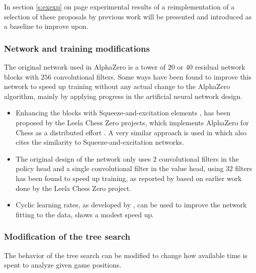 \documentclass[12pt,onecolumn,oneside,titlepage]{article}
\begin{document}
In section \ref{s:exexp} on page \pageref{s:exexp} experimental results of a reimplementation of a selection of these proposals by previous work will be presented and introduced as a baseline to improve upon.

\subsubsection{Network and training modifications}

The original network used in AlphaZero is a tower of $20$ or $40$ residual network blocks with $256$ convolutional filters. Some ways have been found to improve this network to speed up training without any
actual change to the AlphaZero algorithm, mainly by applying progress in the artificial neural network design.

\begin{itemize}
 \item Enhancing the blocks with Squeeze-and-excitation elements \cite{hu2018squeeze}, has been proposed by the Leela Chess Zero projects, which implements AlphaZero for Chess as a distributed effort \cite{leela0sq}.
       A very similar approach is used in \cite{wu2019accelerating} which also cites the similarity to Squeeze-and-excitation networks.
 \item The original design of the network only uses $2$ convolutional filters in the policy head and a single convolutional filter in the value head, using $32$ filters has been found to speed up training, as reported by \cite{oracledevs6} based on earlier work done by the Leela Chess Zero project.
 \item Cyclic learning rates, as developed by \cite{smith2017cyclical}, can be used to improve the network fitting to the data, \cite{oracledevs6} shows a modest speed up.
\end{itemize}

\subsubsection{Modification of the tree search}

The behavior of the tree search can be modified to change how available time is spent to analyze given game positions.
\end{document}
